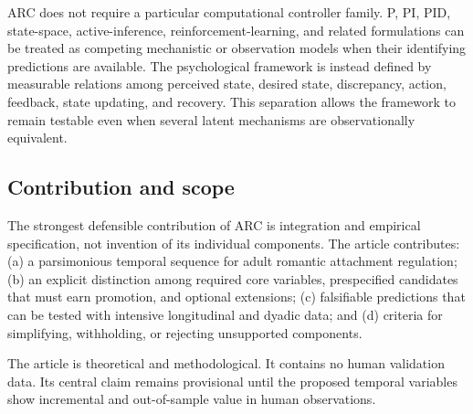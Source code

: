 ARC does not require a particular computational controller family. P, PI, PID, state-space, active-inference, reinforcement-learning, and related formulations can be treated as competing mechanistic or observation models when their identifying predictions are available. The psychological framework is instead defined by measurable relations among perceived state, desired state, discrepancy, action, feedback, state updating, and recovery. This separation allows the framework to remain testable even when several latent mechanisms are observationally equivalent.

\subsection{Contribution and scope}

The strongest defensible contribution of ARC is integration and empirical specification, not invention of its individual components. The article contributes: (a) a parsimonious temporal sequence for adult romantic attachment regulation; (b) an explicit distinction among required core variables, prespecified candidates that must earn promotion, and optional extensions; (c) falsifiable predictions that can be tested with intensive longitudinal and dyadic data; and (d) criteria for simplifying, withholding, or rejecting unsupported components.

The article is theoretical and methodological. It contains no human validation data. Its central claim remains provisional until the proposed temporal variables show incremental and out-of-sample value in human observations.
